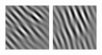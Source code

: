 \begin{figure}
\begin{center}
  \includegraphics[width=\columnwidth/9]{ch4/figures/imag_2_6.jpg}
  \includegraphics[width=\columnwidth/9]{ch4/figures/imag_2_7.jpg}\\

\end{center}
\end{figure}
